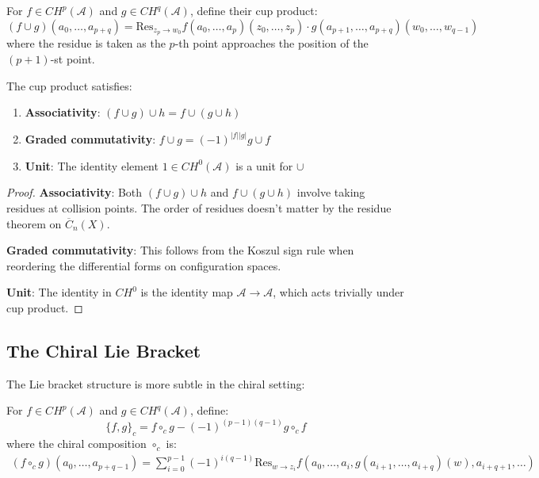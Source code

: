 \begin{definition}
For $f \in CH^p(\mathcal{A})$ and $g \in CH^q(\mathcal{A})$, define their cup product:
\[
(f \cup g)(a_0, \ldots, a_{p+q}) = \text{Res}_{z_p \to w_0} f(a_0, \ldots, a_p)(z_0, \ldots, z_p) \cdot g(a_{p+1}, \ldots, a_{p+q})(w_0, \ldots, w_{q-1})
\]
where the residue is taken as the $p$-th point approaches the position of the $(p+1)$-st point.
\end{definition}

\begin{proposition}
The cup product satisfies:
\begin{enumerate}
\item \textbf{Associativity}: $(f \cup g) \cup h = f \cup (g \cup h)$
\item \textbf{Graded commutativity}: $f \cup g = (-1)^{|f||g|} g \cup f$
\item \textbf{Unit}: The identity element $1 \in CH^0(\mathcal{A})$ is a unit for $\cup$
\end{enumerate}
\end{proposition}

\begin{proof}
\textbf{Associativity}: Both $(f \cup g) \cup h$ and $f \cup (g \cup h)$ involve taking residues at collision points. The order of residues doesn't matter by the residue theorem on $\overline{C}_{n}(X)$.

\textbf{Graded commutativity}: This follows from the Koszul sign rule when reordering the differential forms on configuration spaces.

\textbf{Unit}: The identity in $CH^0$ is the identity map $\mathcal{A} \to \mathcal{A}$, which acts trivially under cup product. \qedhere
\end{proof}

\subsection{The Chiral Lie Bracket}

The Lie bracket structure is more subtle in the chiral setting:

\begin{definition}
For $f \in CH^p(\mathcal{A})$ and $g \in CH^q(\mathcal{A})$, define:
\[
\{f, g\}_c = f \circ_c g - (-1)^{(p-1)(q-1)} g \circ_c f
\]
where the chiral composition $\circ_c$ is:
\begin{align}
(f \circ_c g)(a_0, \ldots, a_{p+q-1}) = \sum_{i=0}^{p-1} (-1)^{i(q-1)} \text{Res}_{w \to z_i} f(a_0, \ldots, a_i, g(a_{i+1}, \ldots, a_{i+q})(w), a_{i+q+1}, \ldots)
\end{align}
\end{definition}

